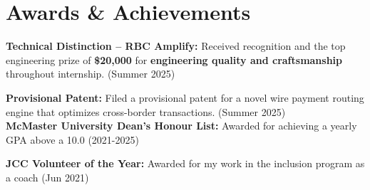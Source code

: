 \documentclass[letterpaper,10pt]{article}
\newcommand{\resumeSubHeadingListStart}{\begin{itemize}[leftmargin=0.15in, label={}]}
\newcommand{\resumeSubHeadingListEnd}{\end{itemize}}
\begin{document}
\section{Awards \& Achievements}
  \vspace{2pt}
  \resumeSubHeadingListStart
    \small{\item{
        \textbf{Technical Distinction {--} RBC Amplify:}{ Received recognition and the top engineering prize of \textbf{\$20,000} for \textbf{engineering quality and craftsmanship} throughout internship. (Summer 2025)} \\ \vspace{3pt}

        \textbf{Provisional Patent:}{ Filed a provisional patent for a novel wire payment routing engine that optimizes cross-border transactions. (Summer 2025)} \\ \vspace{3pt}
        \textbf{McMaster University Dean's Honour List:}{ Awarded for achieving a yearly GPA above a 10.0 (2021-2025)} \\ \vspace{3pt}
        
        \textbf{JCC Volunteer of the Year:}{ Awarded for my work in the inclusion program as a coach (Jun 2021)}
    }}
  \resumeSubHeadingListEnd




        
\end{document}

